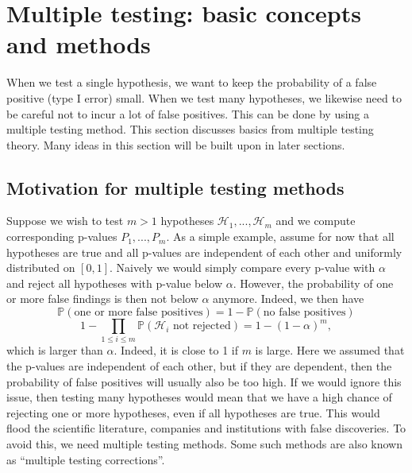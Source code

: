 \documentclass[11pt]{article}
\theoremstyle{plain}
\theoremstyle{definition}
\newcommand{\Hy}{\mathcal{H}}
\newcommand{\pr}{\mathbb{P}}
\begin{document}
\newpage

\section{Multiple testing: basic concepts and methods} \label{secmtbasics}
When we test a single hypothesis, we want to keep the probability of a false positive (type I error) small.
When we test many hypotheses, we likewise need to be careful not to incur a lot of false positives. This can be done by using a multiple testing method. This section discusses basics from multiple testing theory. Many ideas in this section will be built upon in later sections.


\subsection{Motivation for multiple testing methods} \label{motiv}
Suppose we wish to test $m>1$ hypotheses $\Hy_1,...,\Hy_m$ and we  compute corresponding p-values $P_1,...,P_m$. As a simple example, assume for now that all hypotheses are true and all p-values are independent of each other and uniformly distributed on $[0,1]$. Naively we would simply compare every p-value with $\alpha$ and reject all hypotheses with p-value below $\alpha$. However, the probability of one or more false findings is then not below $\alpha$ anymore. Indeed, we then have
$$\pr(\text{one or more false positives})= 1-\pr(\text{no false positives})$$
$$1-\prod_{1\leq i \leq m}\pr(\Hy_i \text{ not rejected}) = 1-(1-\alpha)^m,$$
which is larger than $\alpha$. Indeed, it is close to 1 if $m$ is large. 
Here we assumed that the p-values are independent of each other, but if they are dependent, then the probability of false positives will usually also be too high. If we would ignore this issue, then testing many hypotheses would mean that we have a high chance of rejecting one or more hypotheses, even if all hypotheses are true. This would flood the scientific literature, companies and institutions with false discoveries. To avoid this, we need multiple testing methods. Some such methods are also known as ``multiple testing corrections''.
\end{document}
